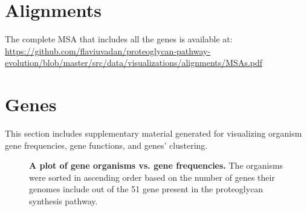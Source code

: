 \documentclass{article}
\begin{document}
\appendix

\section{Alignments}
The complete MSA that includes all the genes is available at: \url{https://github.com/flaviuvadan/proteoglycan-pathway-evolution/blob/master/src/data/visualizations/alignments/MSAs.pdf}

\section{Genes}
This section includes supplementary material generated for visualizing organism gene frequencies, gene functions, and genes' clustering.

\begin{figure}[H]
\centering
{}
\caption{\textbf{A plot of gene organisms vs. gene frequencies.} The organisms were sorted in ascending order based on the number of genes their genomes include out of the 51 gene present in the proteoglycan synthesis pathway.}
\label{sup_fig_1}
\end{figure}
\end{document}
